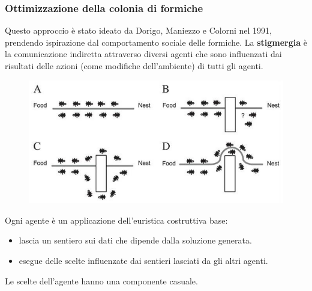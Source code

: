 \documentclass{article}
\begin{document}
\subsubsection{Ottimizzazione della colonia di formiche}
Questo approccio è stato ideato da Dorigo, Maniezzo e Colorni nel 1991, prendendo ispirazione
dal comportamento sociale delle formiche. La \textbf{stigmergia} è la comunicazione indiretta
attraverso diversi agenti che sono influenzati dai risultati delle azioni (come modifiche
dell'ambiente) di tutti gli agenti.
\begin{figure}[H]
    \centering
    \includegraphics[scale=0.5]{images/stigmergy.png}
\end{figure}
Ogni agente è un applicazione dell'euristica costruttiva base:
\begin{itemize}
    \item lascia un sentiero sui dati che dipende dalla soluzione generata.
    \item esegue delle scelte influenzate dai sentieri lasciati da gli altri agenti.
\end{itemize}
Le scelte dell'agente hanno una componente casuale.
\end{document}
